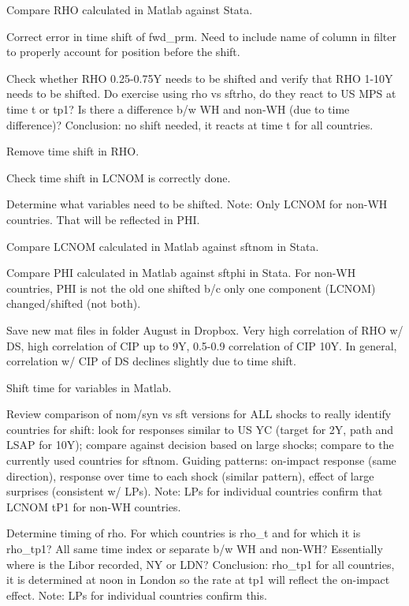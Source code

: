 \documentclass[12pt]{article}
\newcommand{\cmark}{\ding{51}}
\newcommand{\done}{\rlap{$\square$}{\raisebox{2pt}{\large\hspace{1pt}\cmark}}%
	\hspace{-2.5pt}}
\begin{document}
\begin{todolist}
\begin{todolist}
		\item[\done] Compare RHO calculated in Matlab against Stata.
		\item[\done] Correct error in time shift of fwd_prm. Need to include name of column in filter to properly account for position before the shift.
		\item[\done] Check whether RHO 0.25-0.75Y needs to be shifted and verify that RHO 1-10Y needs to be shifted. Do exercise using rho vs sftrho, do they react to US MPS at time t or tp1? Is there a difference b/w WH and non-WH (due to time difference)? Conclusion: no shift needed, it reacts at time t for all countries.
		\item[\done] Remove time shift in RHO.
		\item[\done] Check time shift in LCNOM is correctly done.
		\item[\done] Determine what variables need to be shifted. Note: Only LCNOM for non-WH countries. That will be reflected in PHI.
		\item[\done] Compare LCNOM calculated in Matlab against sftnom in Stata.
		\item[\done] Compare PHI calculated in Matlab against sftphi in Stata. For non-WH countries, PHI is not the old one shifted b/c only one component (LCNOM) changed/shifted (not both).
		\item[\done] Save new mat files in folder August in Dropbox. Very high correlation of RHO w/ DS, high correlation of CIP up to 9Y, 0.5-0.9 correlation of CIP 10Y. In general, correlation w/ CIP of DS declines slightly due to time shift.
	\end{todolist}
	\item[\done] Shift time for variables in Matlab.
	\begin{todolist}
		\item[\done] Review comparison of nom/syn vs sft versions for ALL shocks to really identify countries for shift: look for responses similar to US YC (target for 2Y, path and LSAP for 10Y); compare against decision based on large shocks; compare to the currently used countries for sftnom. Guiding patterns: on-impact response (same direction), response over time to each shock (similar pattern), effect of large surprises (consistent w/ LPs). Note: LPs for individual countries confirm that LCNOM tP1 for non-WH countries.
		\item[\done] Determine timing of rho. For which countries is rho_t and for which it is rho_tp1? All same time index or separate b/w WH and non-WH? Essentially where is the Libor recorded, NY or LDN? Conclusion: rho_tp1 for all countries, it is determined at noon in London so the rate at tp1 will reflect the on-impact effect. Note: LPs for individual countries confirm this.

\end{todolist}
\end{todolist}
\end{document}
